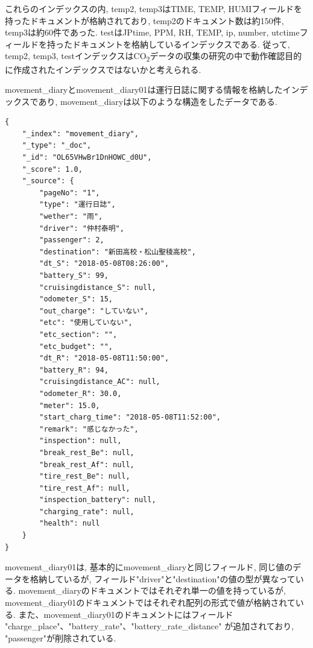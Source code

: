 \documentclass[a4j,12pt,]{jarticle}
\begin{document}
これらのインデックスの内, temp2, temp3はTIME, TEMP, HUMIフィールドを持ったドキュメントが格納されており, temp2のドキュメント数は約150件, temp3は約60件であった.
testはJPtime, PPM, RH, TEMP, ip, number, utctimeフィールドを持ったドキュメントを格納しているインデックスである.
従って, temp2, temp3, testインデックスはCO\textsubscript{2}データの収集の研究の中で動作確認目的に作成されたインデックスではないかと考えられる.

movement\_diaryとmovement\_diary01は運行日誌に関する情報を格納したインデックスであり, movement\_diaryは以下のような構造をしたデータである.

\begin{lstlisting}[caption=movement\_diaryのドキュメントデータ, label=sc1]
  {
    "_index": "movement_diary",
    "_type": "_doc",
    "_id": "OL65VHwBr1DnHOWC_d0U",
    "_score": 1.0,
    "_source": {
        "pageNo": "1",
        "type": "運行日誌",
        "wether": "雨",
        "driver": "仲村泰明",
        "passenger": 2,
        "destination": "新田高校・松山聖稜高校",
        "dt_S": "2018-05-08T08:26:00",
        "battery_S": 99,
        "cruisingdistance_S": null,
        "odometer_S": 15,
        "out_charge": "していない",
        "etc": "使用していない",
        "etc_section": "",
        "etc_budget": "",
        "dt_R": "2018-05-08T11:50:00",
        "battery_R": 94,
        "cruisingdistance_AC": null,
        "odometer_R": 30.0,
        "meter": 15.0,
        "start_charg_time": "2018-05-08T11:52:00",
        "remark": "感じなかった",
        "inspection": null,
        "break_rest_Be": null,
        "break_rest_Af": null,
        "tire_rest_Be": null,
        "tire_rest_Af": null,
        "inspection_battery": null,
        "charging_rate": null,
        "health": null
    }
}
\end{lstlisting}

movement\_diary01は, 基本的にmovement\_diaryと同じフィールド, 同じ値のデータを格納しているが, フィールド"driver"と"destination"の値の型が異なっている.
movement\_diaryのドキュメントではそれぞれ単一の値を持っているが, movement\_diary01のドキュメントではそれぞれ配列の形式で値が格納されている. また、movement\_diary01のドキュメントにはフィールド "charge_place"、"battery_rate"、"battery_rate_distance" が追加されており, "passenger"が削除されている.
\end{document}
